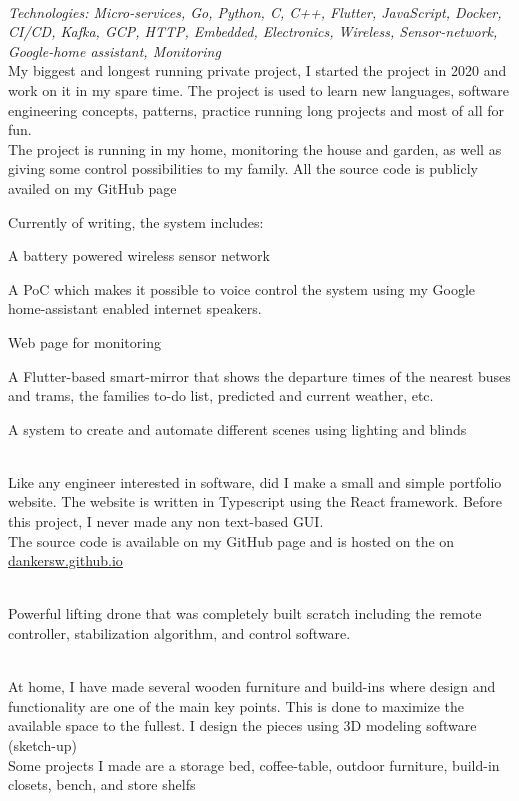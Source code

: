  \\ 
\emph{Technologies: Micro-services, Go, Python, C, C++, Flutter, JavaScript, Docker, CI/CD, Kafka, GCP, HTTP, Embedded, Electronics, Wireless, Sensor-network, Google-home assistant, Monitoring} \\ 

\SmallSep 
My biggest and longest running private project, I started the project in 2020 and work on it in my spare time. The project is used to learn new languages, software engineering concepts, patterns, practice running long projects and most of all for fun. \\ 
\VerySmallSep 
The project is running in my home, monitoring the house and garden, as well as giving some control possibilities to my family. All the source code is publicly availed on my GitHub page \\ 
\VerySmallSep 

Currently of writing, the system includes: 
\begin{compactitem}[\color{RoyalBlue}$\circ$] 
    \item A battery powered wireless sensor network 
    \item A PoC which makes it possible to voice control the system using my Google home-assistant enabled internet speakers. 
    \item Web page for monitoring 
    \item A Flutter-based smart-mirror that shows the departure times of the nearest buses and trams, the families to-do list, predicted and current weather, etc. 
    \item A system to create and automate different scenes using lighting and blinds 
\end{compactitem} 
\Sep 

 \\
Like any engineer interested in software, did I make a small and simple portfolio website. The website is written in Typescript using the React framework. Before this project, I never made any non text-based GUI.\\ 
The source code is available on my GitHub page and is hosted on the on \url{dankersw.github.io}
\Sep

 \\
Powerful lifting drone that was completely built scratch including the remote controller, stabilization algorithm, and control software. 
\Sep

 \\
At home, I have made several wooden furniture and build-ins where design and functionality are one of the main key points. This is done to maximize the available space to the fullest. I design the pieces using 3D modeling software (sketch-up) \\
Some projects I made are a storage bed, coffee-table, outdoor furniture, build-in closets, bench, and store shelfs 
\Sep
